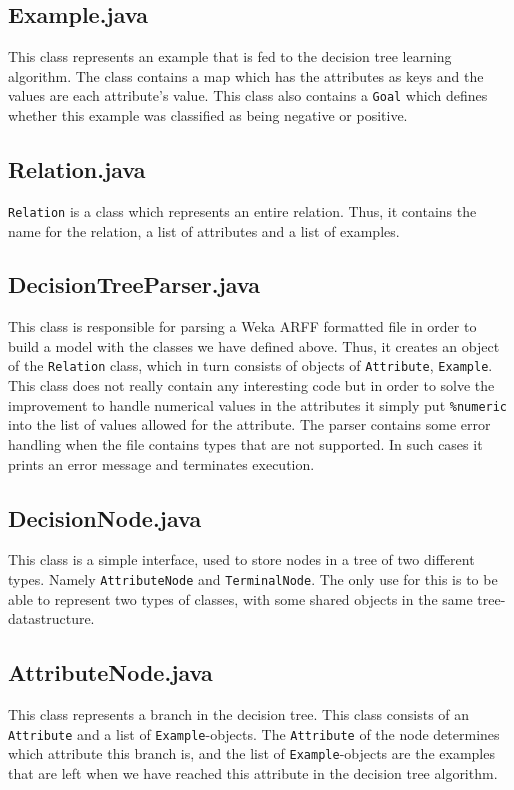 \documentclass[a4paper]{article}
\begin{document}
\subsection{Example.java}
This class represents an example that is fed to the decision tree learning algorithm. The class contains a map which has the attributes as keys and the values are each attribute's value. This class also contains a \texttt{Goal} which defines whether this example was classified as being negative or positive.
\subsection{Relation.java}
\texttt{Relation} is a class which represents an entire relation. Thus, it contains the name for the relation, a list of attributes and a list of examples.
\subsection{DecisionTreeParser.java}
This class is responsible for parsing a Weka ARFF formatted file in order to build a model with the classes we have defined above. Thus, it creates an object of the \texttt{Relation} class, which in turn consists of objects of \texttt{Attribute}, \texttt{Example}. This class does not really contain any interesting code but in order to solve the improvement to handle numerical values in the attributes it simply put \texttt{\%numeric} into the list of values allowed for the attribute. The parser contains some error handling when the file contains types that are not supported. In such cases it prints an error message and terminates execution.
\subsection{DecisionNode.java}
This class is a simple interface, used to store nodes in a tree of two different types. Namely \texttt{AttributeNode} and \texttt{TerminalNode}. The only use for this is to be able to represent two types of classes, with some shared objects in the same tree-datastructure.
\subsection{AttributeNode.java}
This class represents a branch in the decision tree. This class consists of an \texttt{Attribute} and a list of \texttt{Example}-objects. The \texttt{Attribute} of the node determines which attribute this branch is, and the list of \texttt{Example}-objects are the examples that are left when we have reached this attribute in the decision tree algorithm. 
\end{document}

